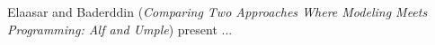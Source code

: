 

Elaasar and Baderddin
\cite{isola-2016-elaasar}
({\em Comparing Two Approaches Where Modeling Meets
Programming: Alf and Umple})
present ...

